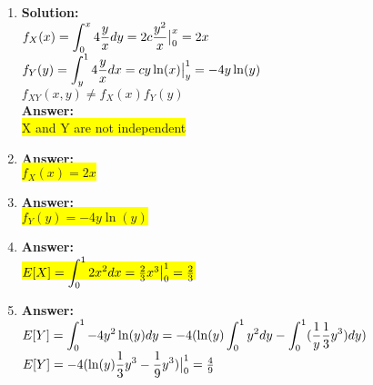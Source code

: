 \documentclass{article}
\newcommand{\myansw}{\textbf{Answer:}\\}
\newcommand{\mysolu}{\textbf{Solution:}\\}
\begin{document}
\begin{enumerate}
\begin{enumerate}
		\item
		\mysolu
		${f_X(x) = \mathlarger{\int_{0}^{x}4\frac{y}{x}dy}=\mathlarger{2c\frac{y^2}{x}\big|_{0}^{x}}=2x}$\\
		${f_Y(y) = \mathlarger{\int_{y}^{1}4\frac{y}{x}dx}=\mathlarger{cy\ln(x)\big|_{y}^{1}}=-4y\ln(y)}$\\
		${f_{XY}(x,y) \neq f_X(x)f_Y(y)}$\\
		\myansw
		\colorbox{yellow}{X and Y are not independent}\\
		\item
		\myansw
		\colorbox{yellow}{${f_X(x) =2x}$ }\\
		\item
		\myansw
		\colorbox{yellow}{${f_Y(y) =-4y\ln(y)}$ }\\
		\item
		\myansw
		\colorbox{yellow}{${E[X] = \mathlarger{\int_{0}^{1}2x^2dx}=\frac{2}{3}x^3\big|_{0}^{1}=\frac{2}{3}}$}\\
		\item
		\myansw
		${E[Y] = \mathlarger{\int_{0}^{1}-4y^2\ln(y)dy=-4(\ln(y)\int_{0}^{1}y^2dy-\int_{0}^{1}(\frac{1}{y}\frac{1}{3}y^3)dy)}}$\\
		${E[Y] = \mathlarger{-4(\ln(y)\frac{1}{3}y^3-\frac{1}{9}y^3)\big|_{0}^{1}} = \frac{4}{9}}$


\end{enumerate}
\end{enumerate}
\end{document}
